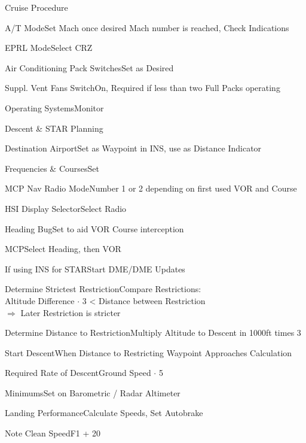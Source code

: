 \documentclass[sim-use, blue_items]{checklist}
\begin{document}
\begin{checklist}{Cruise Procedure}
	\item{A/T Mode}{Set Mach once desired Mach number is reached, Check Indications}
	\item{EPRL Mode}{Select CRZ}
	\item{Air Conditioning Pack Switches}{Set as Desired}
	\item{Suppl. Vent Fans Switch}{On, Required if less than two Full Packs operating}
	\item{Operating Systems}{Monitor}
\end{checklist}

\begin{checklist}{Descent \& STAR Planning}
	\item{Destination Airport}{Set as Waypoint in INS, use as Distance Indicator}
	 {
		\item{Frequencies \& Courses}{Set}
		\item{MCP Nav Radio Mode}{Number 1 or 2 depending on first used VOR and Course}
		\item{HSI Display Selector}{Select Radio}
		\item{Heading Bug}{Set to aid VOR Course interception}
		\item{MCP}{Select Heading, then VOR}
	}
	\item{If using INS for STAR}{Start DME/DME Updates}
	 {
		\item{Determine Strictest Restriction}{Compare Restrictions:\\Altitude Difference $\cdot$ 3 < Distance between Restriction\\$\Rightarrow$ Later Restriction is stricter}
		\item{Determine Distance to Restriction}{Multiply Altitude to Descent in 1000ft times 3}
		\item{Start Descent}{When Distance to Restricting Waypoint Approaches Calculation}
		\item{Required Rate of Descent}{Ground Speed $\cdot$ 5}
	}
	\item{Minimums}{Set on Barometric / Radar Altimeter}
	\item{Landing Performance}{Calculate Speeds, Set Autobrake}
	\item{Note Clean Speed}{F1 + 20}
\end{checklist}
\end{document}

